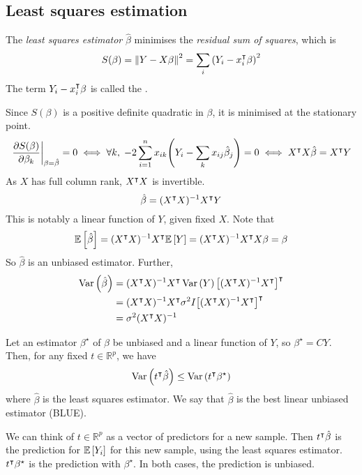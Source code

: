 \subsection{Least squares estimation}
\begin{definition}
	The \textit{least squares estimator} \( \hat \beta \) minimises the \textit{residual sum of squares}, which is
	\[
		S(\beta) = \norm{Y-X\beta}^2 = \sum_i \qty(Y_i - x_i^\intercal \beta)^2
	\]
	The term \( Y_i - x_i^\intercal \beta \) is called the .
\end{definition}
Since \( S(\beta) \) is a positive definite quadratic in \( \beta \), it is minimised at the stationary point.
\[
	\eval{\pdv{S(\beta)}{\beta_k}}_{\beta = \hat \beta} = 0 \iff \forall k,\;-2\sum_{i=1}^n x_{ik} \qty(Y_i - \sum_k x_{ij} \hat \beta_j) = 0 \iff X^\transpose X \hat \beta = X^\transpose Y
\]
As \( X \) has full column rank, \( X^\intercal X \) is invertible.
\[
	\hat \beta = (X^\intercal X)^{-1} X^\intercal Y
\]
This is notably a linear function of \( Y \), given fixed \( X \).
Note that
\[
	\mathbb{E}\left[{\hat \beta}\right] = (X^\intercal X)^{-1} X^\intercal \mathbb{E}\left[{Y}\right] = (X^\intercal X)^{-1} X^\intercal X\beta = \beta
\]
So \( \hat \beta \) is an unbiased estimator.
Further,
\begin{align*}
	\operatorname{Var}\left({\hat \beta}\right) & = (X^\intercal X)^{-1} X^\intercal \operatorname{Var}\left({Y}\right) \qty[(X^\intercal X)^{-1} X^\intercal]^\intercal     \\
	                 & = (X^\intercal X)^{-1} X^\intercal \sigma^2 I \qty[(X^\intercal X)^{-1} X^\intercal]^\intercal \\
	                 & = \sigma^2 (X^\intercal X)^{-1}
\end{align*}
\begin{theorem}
	Let an estimator \( \beta^\star \) of \( \beta \) be unbiased and a linear function of \( Y \), so \( \beta^\star = CY \).
	Then, for any fixed \( t \in \mathbb R^p \), we have
	\[
		\operatorname{Var}\left({t^\intercal \hat \beta}\right) \leq \operatorname{Var}\left({t^\intercal \beta^\star}\right)
	\]
	where \( \hat \beta \) is the least squares estimator.
	We say that \( \hat \beta \) is the best linear unbiased estimator (BLUE).
\end{theorem}
\begin{remark}
	We can think of \( t \in \mathbb R^p \) as a vector of predictors for a new sample.
	Then \( t^\intercal \hat \beta \) is the prediction for \( \mathbb{E}\left[{Y_i}\right] \) for this new sample, using the least squares estimator.
	\( t^\intercal \beta^\star \) is the prediction with \( \beta^\star \).
	In both cases, the prediction is unbiased.
\end{remark}
